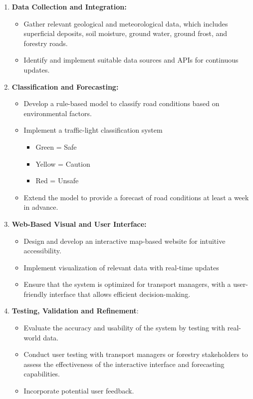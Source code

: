 \begin{enumerate}
    \item \textbf{Data Collection and Integration:}
    \begin{itemize}
        \item Gather relevant geological and meteorological data, which includes superficial deposits, soil moisture, ground water, ground frost, and forestry roads.
        \item Identify and implement suitable data sources and APIs for continuous updates.
    \end{itemize}
    
    \item \textbf{Classification and Forecasting:}
    \begin{itemize}
        \item Develop a rule-based model to classify road conditions based on environmental factors. 
        \item Implement a traffic-light classification system
        \begin{itemize}
            \item Green = Safe
            \item Yellow = Caution
            \item Red = Unsafe
        \end{itemize}
        \item Extend the model to provide a forecast of road conditions at least a week in advance. 
    \end{itemize}
    
    \item \textbf{Web-Based Visual and User Interface:}
    \begin{itemize}
        \item Design and develop an interactive map-based website for intuitive accessibility. 
        \item Implement visualization of relevant data with real-time updates 
        \item Ensure that the system is optimized for transport managers, with a user-friendly interface that allows efficient decision-making. 
    \end{itemize}
    
    \item \textbf{Testing, Validation and Refinement}:
    \begin{itemize}
        \item Evaluate the accuracy and usability of the system by testing with real-world data. 
        \item Conduct user testing with transport managers or forestry stakeholders to assess the effectiveness of the interactive interface and forecasting capabilities. 
        \item Incorporate potential user feedback. 
    \end{itemize} 
\end{enumerate}



